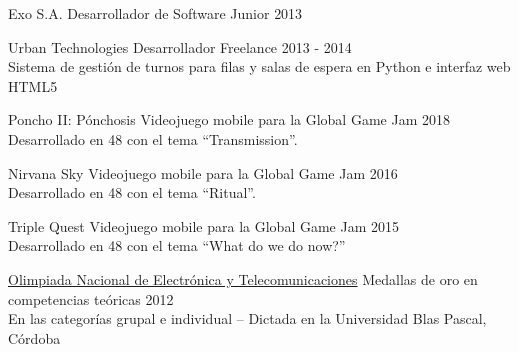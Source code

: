 \documentclass[10pt,a4paper]{article}
\begin{document}
\vspace{0.2em}
\headedsection
    { Exo S.A. }
    { \textsc{} }{
    \headedsubsection
        { Desarrollador de Software Junior }
        { 2013 }
        {}
}

\vspace{0.2em}
\headedsection
    { Urban Technologies }
    { \textsc{} }{
    \headedsubsection
        { Desarrollador Freelance }
        { 2013 - 2014 }
        { \\ Sistema de gestión de turnos para filas y salas de espera en Python e interfaz web HTML5 \href{http://www.eitsa.com.ar/producto.php?c=3&p=14}{\ExternalLink} }
}

\pagebreak

\spacedhrule{0.8em}{-0.4em} %


\vspace{0.2em}
\headedsection
    { Poncho II: Pónchosis \href{https://globalgamejam.org/2018/games/poncho-ii-p\%C3\%B3nchosis}{\ExternalLink} }
    { \textsc{} }{
    \headedsubsection
        { Videojuego mobile para la Global Game Jam }
        { 2018 }
        { \\ Desarrollado en 48 con el tema ``Transmission''. }
}

\vspace{0.2em}
\headedsection
    { Nirvana Sky \href{http://globalgamejam.org/2016/games/nirvana-sky}{\ExternalLink} }
    { \textsc{} }{
    \headedsubsection
        { Videojuego mobile para la Global Game Jam }
        { 2016 }
        { \\ Desarrollado en 48 con el tema ``Ritual''. }
}

\vspace{0.2em}
\headedsection
    { Triple Quest \href{http://globalgamejam.org/2015/games/triple-quest}{\ExternalLink} }
    { \textsc{} }{
    \headedsubsection
        { Videojuego mobile para la Global Game Jam }
        { 2015 }
        { \\ Desarrollado en 48 con el tema ``What do we do now?'' }
}

\vspace{0.2em}
\headedsection
    { \href{}{Olimpiada Nacional de Electrónica y Telecomunicaciones} }
    { \textsc{} }{
    \headedsubsection
        { Medallas de oro en competencias teóricas }
        { 2012 }
        { \\ En las categorías grupal e individual -- Dictada en la Universidad Blas Pascal, Córdoba }
}
\end{document}
